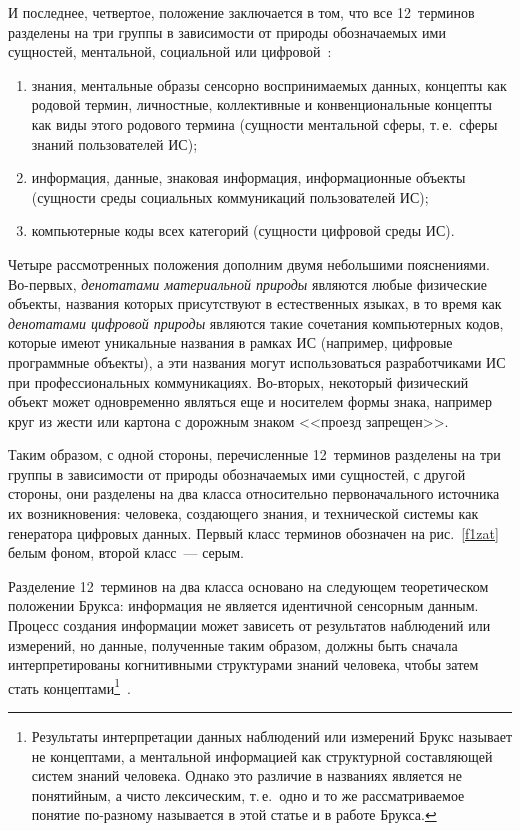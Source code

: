 \begin{multicols}{2}
   И последнее, четвертое, положение заключается в том, что все 12~терминов разделены на 
три группы в зависимости от природы обозначаемых ими сущностей, ментальной, 
социальной или циф\-ро\-вой~\cite{24zat}:
   \begin{enumerate}[(1)]
\item знания, ментальные образы сенсорно воспринимаемых данных, концепты как 
родовой \mbox{термин}, личностные, коллективные и конвенциональные концепты как виды 
этого родового термина (сущности ментальной сферы, т.\,е.\ сферы знаний 
пользователей ИС);
\item информация, данные, знаковая информация, информационные объекты 
(сущности среды социальных коммуникаций пользователей ИС);
\item компьютерные коды всех категорий (сущности цифровой среды ИС).
\end{enumerate}

   Четыре рассмотренных положения дополним двумя небольшими пояснениями. 
   Во-первых, \textit{денотатами материальной природы} являются любые физические 
объекты, названия которых присутствуют в естественных языках, в то время как 
\textit{денотатами цифровой природы} являются такие сочетания компьютерных кодов, 
которые имеют уникальные названия в рамках ИС (например, цифровые программные 
объекты), а эти названия могут использоваться разработчиками ИС при профессиональных 
коммуникациях. Во-вторых, некоторый физический объект может одновременно являться 
еще и носителем формы знака, например круг из жести или картона с дорожным знаком 
<<проезд запрещен>>.
   
   Таким образом, с одной стороны, перечисленные 12~терминов разделены на три группы в 
зависимости от природы обозначаемых ими сущностей, с другой стороны, они разделены на 
два класса относительно первоначального источника их возникновения: человека, 
создающего знания, и технической системы как генератора цифровых данных. Первый класс 
терминов обозначен на рис.~\ref{f1zat} белым фоном, второй класс~--- серым.
   
   Разделение 12~терминов на два класса основано на следующем теоретическом 
положении Брукса: информация не является идентичной сенсорным данным. Процесс 
создания информации может зависеть от результатов наблюдений или измерений, но 
данные, полученные таким образом, должны быть сначала интерпретированы когнитивными 
структурами знаний человека, чтобы затем стать концептами\footnote{Результаты 
интерпретации данных наблюдений или измерений Брукс называет не концептами, а ментальной информацией 
как структурной составляющей систем знаний человека. Однако это различие в названиях является не 
понятийным, а чисто лексическим, т.\,е.\ одно и то же рассматриваемое понятие по-разному называется в 
этой статье и в работе Брукса.}~\cite{25zat, 26zat}.
   

\end{multicols}
